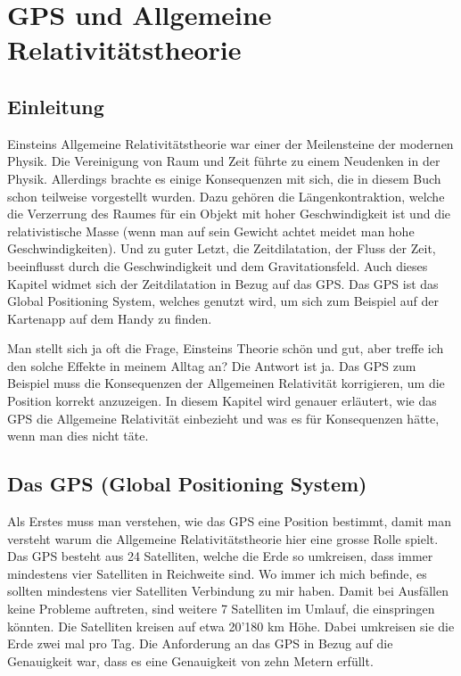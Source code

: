 
\chapter{GPS und Allgemeine Relativitätstheorie\label{chapter:thema}}
\begin{refsection}

\section{Einleitung}
Einsteins Allgemeine Relativitätstheorie war einer der Meilensteine der modernen Physik. Die Vereinigung von Raum und Zeit führte zu einem Neudenken in der Physik. Allerdings brachte es einige Konsequenzen mit sich, die in diesem Buch schon teilweise vorgestellt wurden. Dazu gehören die Längenkontraktion, welche die Verzerrung des Raumes für ein Objekt mit hoher Geschwindigkeit ist und die relativistische Masse (wenn man auf sein Gewicht achtet meidet man hohe Geschwindigkeiten). Und zu guter Letzt, die Zeitdilatation, der Fluss der Zeit, beeinflusst durch die Geschwindigkeit und dem Gravitationsfeld. Auch dieses Kapitel widmet sich der Zeitdilatation in Bezug auf das GPS. Das GPS ist das Global Positioning System, welches genutzt wird, um sich zum Beispiel auf der Kartenapp auf dem Handy zu finden.

Man stellt sich ja oft die Frage, Einsteins Theorie schön und gut, aber treffe ich den solche Effekte in meinem Alltag an? Die Antwort ist ja. Das GPS zum Beispiel muss die Konsequenzen der Allgemeinen Relativität korrigieren, um die Position korrekt anzuzeigen. In diesem Kapitel wird genauer erläutert, wie das GPS die Allgemeine Relativität einbezieht und was es für Konsequenzen hätte, wenn man dies nicht täte.

\section{Das GPS (Global Positioning System)}
Als Erstes muss man verstehen, wie das GPS eine Position bestimmt, damit man versteht warum die Allgemeine Relativitätstheorie hier eine grosse Rolle spielt. Das GPS besteht aus 24 Satelliten, welche die Erde so umkreisen, dass immer mindestens vier Satelliten in Reichweite sind. Wo immer ich mich befinde, es sollten mindestens vier Satelliten Verbindung zu mir haben. Damit bei Ausfällen keine Probleme auftreten, sind weitere 7 Satelliten im Umlauf, die einspringen könnten. Die Satelliten kreisen auf etwa 20'180 km Höhe. Dabei umkreisen sie die Erde zwei mal pro Tag. Die Anforderung an das GPS in Bezug auf die Genauigkeit war, dass es eine Genauigkeit von zehn Metern erfüllt. 


\end{refsection}
